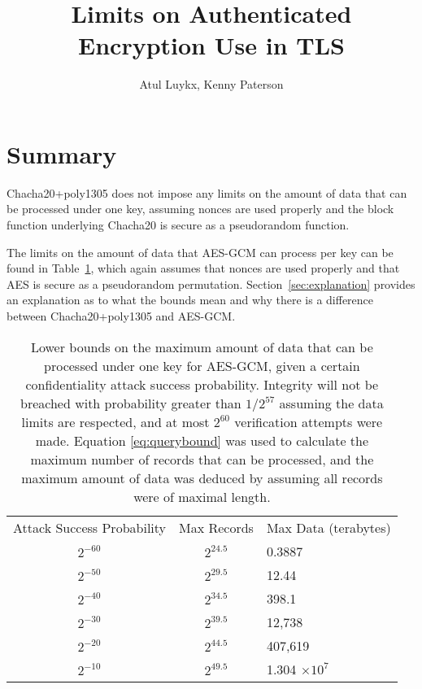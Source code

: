 \documentclass{article}
\title{Limits on Authenticated Encryption Use in TLS}
\author{Atul Luykx, Kenny Paterson}
\begin{document}
\maketitle



\section{Summary}
Chacha20+poly1305 does not impose any limits on the amount of data that can be processed under one key, assuming nonces are used properly and the block function underlying Chacha20 is secure as a pseudorandom function.

The limits on the amount of data that AES-GCM can process per key can be found in Table~\ref{table:gcm-bounds}, which again assumes that nonces are used properly and that AES is secure as a pseudorandom permutation. Section~\ref{sec:explanation} provides an explanation as to what the bounds mean and why there is a difference between Chacha20+poly1305 and AES-GCM.

\begin{table}[H]
  \centering
  \caption{Lower bounds on the maximum amount of data that can be processed under one key for AES-GCM, given a certain confidentiality attack success probability. Integrity will not be breached with probability greater than $1/2^{57}$ assuming the data limits are respected, and at most $2^{60}$ verification attempts were made. Equation \ref{eq:querybound} was used to calculate the maximum number of records that can be processed, and the maximum amount of data was deduced by assuming all records were of maximal length.}\label{table:gcm-bounds}
  \begin{tabular}{ccl}
    \toprule
    Attack Success Probability  & Max Records & Max Data (terabytes)\\
    \cmidrule{1-3}
    $2^{-60}$ & $2^{24.5}$ & 0.3887\\
    $2^{-50}$ & $2^{29.5}$ & 12.44 \\
    $2^{-40}$ & $2^{34.5}$ & 398.1\\
    $2^{-30}$ & $2^{39.5}$ & 12,738\\
    $2^{-20}$ & $2^{44.5}$ & 407,619\\
    $2^{-10}$ & $2^{49.5}$ & 1.304 $\times 10^7$\\
    \bottomrule
  \end{tabular}
\end{table}
\end{document}
